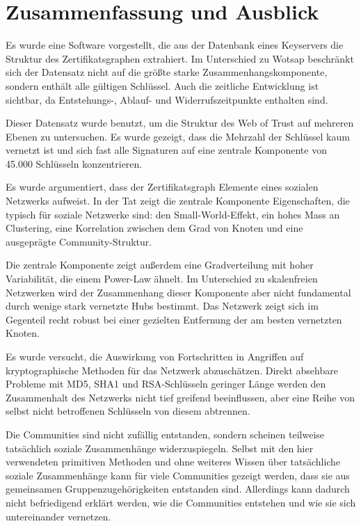 
\chapter{Zusammenfassung und Ausblick}
\label{ch:Zusammenfassung}

Es wurde eine Software vorgestellt, die aus der Datenbank eines
Keyservers die Struktur des Zertifikatsgraphen extrahiert. Im
Unterschied zu Wotsap beschränkt sich der Datensatz nicht auf die
größte starke Zusammenhangskomponente, sondern enthält alle
g\"ultigen Schlüssel. Auch die zeitliche Entwicklung ist sichtbar, da
Entstehungs-, Ablauf- und Widerrufszeitpunkte enthalten sind.

Dieser Datensatz wurde benutzt, um die Struktur des Web of Trust auf
mehreren Ebenen zu untersuchen. Es wurde gezeigt, dass die Mehrzahl
der Schlüssel kaum vernetzt ist und sich fast alle Signaturen auf
eine zentrale Komponente von 45.000 Schlüsseln konzentrieren. 

Es wurde argumentiert, dass der Zertifikatsgraph Elemente eines
sozialen Netzwerks aufweist. In der Tat zeigt die zentrale
Komponente Eigenschaften, die typisch für soziale Netzwerke sind:
den Small-World-Effekt, ein hohes Mass an Clustering, eine Korrelation
zwischen dem Grad von Knoten und eine ausgeprägte
Community-Struktur.

Die zentrale Komponente zeigt au{\ss}erdem eine Gradverteilung mit
hoher Variabilit\"at, die einem Power-Law \"ahnelt. Im Unterschied zu
skalenfreien Netzwerken wird der Zusammenhang dieser Komponente aber
nicht fundamental durch wenige stark vernetzte Hubs bestimmt. Das
Netzwerk zeigt sich im Gegenteil recht robust bei einer gezielten
Entfernung der am besten vernetzten Knoten.

Es wurde versucht, die Auswirkung von Fortschritten in Angriffen auf
kryptographische Methoden für das Netzwerk abzuschätzen. Direkt
absehbare Probleme mit MD5, SHA1 und RSA-Schlüsseln geringer Länge
werden den Zusammenhalt des Netzwerks nicht tief greifend beeinflussen,
aber eine Reihe von selbst nicht betroffenen Schlüsseln von diesem
abtrennen.

Die Communities sind nicht zufällig entstanden, sondern scheinen
teilweise tatsächlich soziale Zusammenhänge
widerzuspiegeln. Selbst mit den hier verwendeten primitiven Methoden
und ohne weiteres Wissen über tatsächliche soziale Zusammenhänge
kann für viele Communities gezeigt werden, dass sie aus gemeinsamen
Gruppenzugehörigkeiten entstanden sind. Allerdings kann dadurch
nicht befriedigend erklärt werden, wie die Communities entstehen
und wie sie sich untereinander vernetzen.


